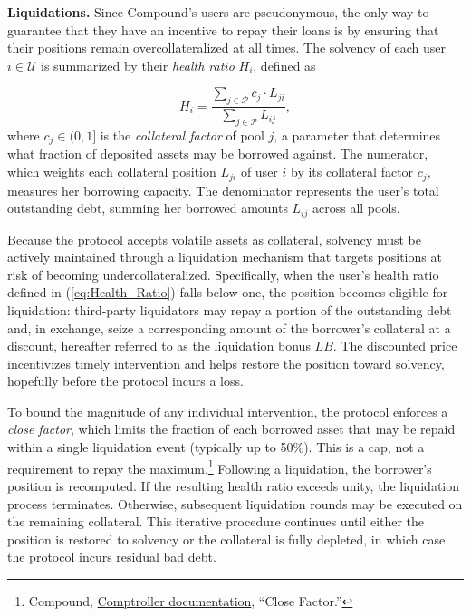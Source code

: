 \documentclass[a4paper,UKenglish,cleveref, autoref, thm-restate]{informs3}
\DeclareRobustCommand{\latestrev}[1]{{\color{red}\hypersetup{linkcolor=red,citecolor=red,urlcolor=red}#1}}
\begin{document}
\medskip

\textbf{Liquidations.} Since Compound's users are pseudonymous, the only way to guarantee that they have an incentive to repay their loans is by ensuring that their positions remain overcollateralized at all times. The solvency of each user $i \in \mathcal{U}$ is summarized by their \textit{health ratio} $H_i$, defined as

\begin{equation}
    H_i = \frac{\sum_{j \in \mathcal{P}} c_j\cdot L_{ji}}{\sum_{j \in \mathcal{P}} L_{ij}},
    \label{eq:Health_Ratio}
\end{equation}
where $c_j \in (0,1]$ is the \textit{collateral factor} of pool $j$, a parameter that determines what fraction of deposited assets may be borrowed against. The numerator, which weights each collateral position $L_{ji}$ of user $i$ by its collateral factor $c_j$, measures her borrowing capacity. The denominator represents the user's total outstanding debt, summing her borrowed amounts $L_{ij}$ across all pools.


Because the protocol accepts volatile assets as collateral, solvency must be actively maintained through a liquidation mechanism that targets positions at risk of becoming undercollateralized. Specifically, when the user's health ratio defined in (\ref{eq:Health_Ratio}) falls below one, the position becomes eligible for liquidation: third-party liquidators may repay a portion of the outstanding debt and, in exchange, seize a corresponding amount of the borrower's collateral at a discount, hereafter referred to as the liquidation bonus $LB$. The discounted price incentivizes timely intervention and helps restore the position toward solvency, hopefully before the protocol incurs a loss. 


To bound the magnitude of any individual intervention, the protocol enforces a \textit{close factor}, which limits the fraction of \latestrev{each borrowed asset} that may be repaid within a single liquidation event (typically up to 50\%). \latestrev{This is a cap, not a requirement to repay the maximum.}\footnote{\latestrev{Compound, \href{https://docs.compound.finance/v2/comptroller/}{Comptroller documentation}, ``Close Factor.''}} Following \latestrev{a liquidation}, the borrower’s position is recomputed. If the resulting health ratio exceeds unity, the liquidation process terminates. Otherwise, subsequent liquidation rounds may be executed on the remaining collateral. This iterative procedure continues until either the position is restored to solvency or the collateral is fully depleted, in which case the protocol incurs residual bad debt.
\end{document}

